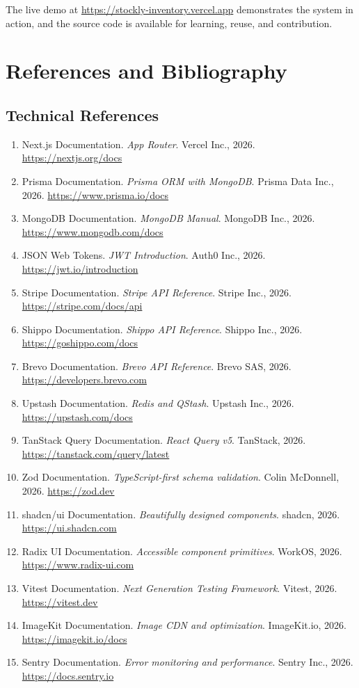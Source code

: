 \documentclass[12pt,a4paper]{report}
\begin{document}
The live demo at \url{https://stockly-inventory.vercel.app} demonstrates the system in action, and the source code is available for learning, reuse, and contribution.





\appendix

\chapter*{References and Bibliography}
\section{Technical References}

\begin{enumerate}[leftmargin=1.5em]
  \item Next.js Documentation. \textit{App Router}. Vercel Inc., 2026. \url{https://nextjs.org/docs}
  \item Prisma Documentation. \textit{Prisma ORM with MongoDB}. Prisma Data Inc., 2026. \url{https://www.prisma.io/docs}
  \item MongoDB Documentation. \textit{MongoDB Manual}. MongoDB Inc., 2026. \url{https://www.mongodb.com/docs}
  \item JSON Web Tokens. \textit{JWT Introduction}. Auth0 Inc., 2026. \url{https://jwt.io/introduction}
  \item Stripe Documentation. \textit{Stripe API Reference}. Stripe Inc., 2026. \url{https://stripe.com/docs/api}
  \item Shippo Documentation. \textit{Shippo API Reference}. Shippo Inc., 2026. \url{https://goshippo.com/docs}
  \item Brevo Documentation. \textit{Brevo API Reference}. Brevo SAS, 2026. \url{https://developers.brevo.com}
  \item Upstash Documentation. \textit{Redis and QStash}. Upstash Inc., 2026. \url{https://upstash.com/docs}
  \item TanStack Query Documentation. \textit{React Query v5}. TanStack, 2026. \url{https://tanstack.com/query/latest}
  \item Zod Documentation. \textit{TypeScript-first schema validation}. Colin McDonnell, 2026. \url{https://zod.dev}
  \item shadcn/ui Documentation. \textit{Beautifully designed components}. shadcn, 2026. \url{https://ui.shadcn.com}
  \item Radix UI Documentation. \textit{Accessible component primitives}. WorkOS, 2026. \url{https://www.radix-ui.com}
  \item Vitest Documentation. \textit{Next Generation Testing Framework}. Vitest, 2026. \url{https://vitest.dev}
  \item ImageKit Documentation. \textit{Image CDN and optimization}. ImageKit.io, 2026. \url{https://imagekit.io/docs}
  \item Sentry Documentation. \textit{Error monitoring and performance}. Sentry Inc., 2026. \url{https://docs.sentry.io}
\end{enumerate}
\end{document}
